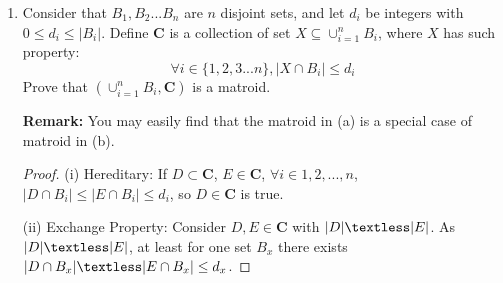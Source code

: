 \documentclass[12pt,a4paper]{article}
\theoremstyle{definition}
\begin{document}
\begin{enumerate}
\begin{enumerate}
\begin{proof}
        \begin{minipage}[t]{0.8\textwidth}
        	\begin{algorithm}[H]
        		\BlankLine
        		\caption{Greedy-MAX}
        		\label{Alg-selectionsort}
        		\BlankLine
        		Sort all elements in A into ordering $c(x_1)\ge c(x_2)\ge...\ge c(x_n)$
        		
        		$I\leftarrow\emptyset$
        		
        		{
        		}
        		\Return $I$
        	\end{algorithm}
        \end{minipage}
    
    	Correctness:Firstly we try to prove $(A,\mathbf{C})$ is a matroid.
    	
    	(i) Hereditary:  If $D\subset \mathbf{C}$, $E\in\mathbf{C}$, obviously $|D|\textless|E|\le k$ and $D\subset A$, so $D \in \mathbf{C}$ is true.
    	
    	(ii) Exchange Property: Consider $D,E\in \mathbf{C}$ with $|D|\textless|E|$. Because $|E|\le k$, $|D|\le k-1$. Choose an element $x$ in $E$ that is not in $D$. Then $|D\cup \{x\}|\le k$ and $D\cup \{x\}$ is a subset of $A$. So $D\cup \{x\} \in \mathbf{C}$ is true.
    	
    	So $(A,\mathbf{C})$ is a matroid. We can prove the correctness of Greedy-MAX algorithm to solve this problem.
    \end{proof}
\item
Consider that $B_1,B_2 ... B_n$ are $n$ disjoint sets, and let $d_i$ be integers with $0\leq d_{i}\leq |B_{i}|$. Define $\mathbf{C}$ is a collection of set $X\subseteq \cup^{n}_{i=1} B_i$, where $X$ has such property:
$$\forall i\in \{1,2,3 ... n\},  |X\cap B_{i}|\leq d_{i}$$
Prove that $(\cup^{n}_{i=1} B_i,\mathbf{C})$ is a matroid.\par
\textbf{Remark:} You may easily find that the matroid in (a) is a special case of matroid in (b).
    \begin{proof}
        	
        (i) Hereditary:  If $D\subset \mathbf{C}$, $E\in\mathbf{C}$, $\forall i\in{1,2,...,n}$, $|D\cap B_i|\le|E\cap B_i|\le d_i$, so $D \in \mathbf{C}$ is true.
        
        (ii) Exchange Property: Consider $D,E\in \mathbf{C}$ with $|D|\textless|E|$. As $|D|\textless|E|$, at least for one set $B_x$ there exists $|D\cap B_x|\textless|E\cap B_x|\le d_x$.
        

\end{proof}
\end{enumerate}
\end{enumerate}
\end{document}

